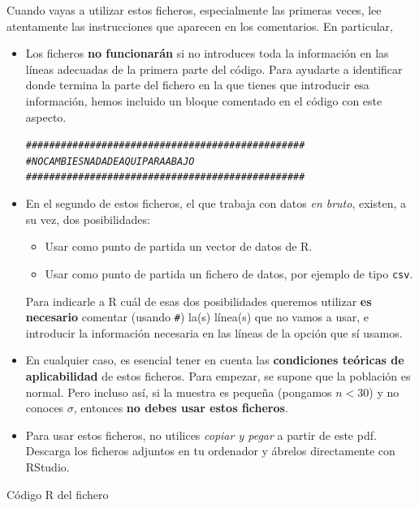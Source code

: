 \documentclass[10pt,a4paper]{article}\usepackage[]{graphicx}\usepackage[]{color}
\makeatletter
\newcommand{\hlcom}[1]{\textcolor[rgb]{0.678,0.584,0.686}{\textit{#1}}}%
\newenvironment{kframe}{%
 \def\at@end@of@kframe{}%
 \ifinner\ifhmode%
  \def\at@end@of@kframe{\end{minipage}}%
  \begin{minipage}{\columnwidth}%
 \fi\fi%
 \def\FrameCommand##1{\hskip\@totalleftmargin \hskip-\fboxsep
 \colorbox{shadecolor}{##1}\hskip-\fboxsep
     \hskip-\linewidth \hskip-\@totalleftmargin \hskip\columnwidth}%
 \MakeFramed {\advance\hsize-\width
   \@totalleftmargin\z@ \linewidth\hsize
   \@setminipage}}%
 {\par\unskip\endMakeFramed%
 \at@end@of@kframe}
\newenvironment{knitrout}{}{} %
\makeatother
\begin{document}
Cuando vayas a utilizar estos ficheros, especialmente las primeras veces, lee atentamente las instrucciones que aparecen en los comentarios. En particular,
\begin{itemize}
  \item Los ficheros {\bf no funcionarán} si no introduces toda la información en las líneas adecuadas de la primera parte del código. Para ayudarte a identificar donde termina la parte del fichero en la que tienes que introducir esa información, hemos incluido un bloque comentado en el código con este aspecto.
\begin{knitrout}
\color{fgcolor}\begin{kframe}
\begin{alltt}
  \hlcom{################################################}
  \hlcom{# NO CAMBIES NADA DE AQUI PARA ABAJO}
  \hlcom{################################################}
\end{alltt}
\end{kframe}
\end{knitrout}
  \item En el segundo de estos ficheros, el que trabaja con datos {\em en bruto}, existen, a su vez, dos posibilidades:
      \begin{itemize}
        \item Usar como punto de partida un vector de datos de R.
        \item Usar como punto de partida un fichero de datos, por ejemplo de tipo {\tt csv}.
      \end{itemize}
      Para indicarle a R cuál de esas dos posibilidades queremos utilizar {\bf es necesario} comentar (usando \verb/#/) la(s) línea(s) que no vamos a usar, e introducir la información necesaria en las líneas de la opción que sí usamos.
  \item En cualquier caso, es esencial tener en cuenta las {\bf condiciones teóricas de aplicabilidad} de estos ficheros. Para empezar, se supone que la población es normal. Pero incluso así, si la muestra es pequeña (pongamos $n < 30$) y no conoces $\sigma$, entonces {\bf no debes usar estos ficheros}.
  \item Para usar estos ficheros, no utilices {\em copiar y pegar} a partir de este pdf. Descarga los ficheros adjuntos en tu ordenador y ábrelos directamente con RStudio.
\end{itemize}

\begin{table}[p]

\caption{Código R del fichero }
\label{tut05:tabla:Tut06-IntConf-Media-UsandoZ-Estadisticos.R}
\end{table}
\end{document}
